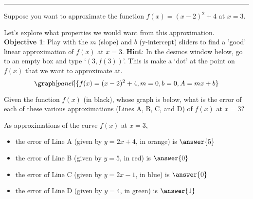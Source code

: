 \documentclass[handout,nooutcomes]{ximera}
\begin{document}
\hrule
\medskip

Suppose you want to approximate the function $f(x) = (x-2)^2  + 4$ at $x=3$.

Let's explore what properties we would want from this approximation.\\


{\bf Objective 1}: Play with the $m$ (slope) and $b$ (y-intercept) sliders to find
a 'good' linear approximation of $f(x)$ at $x=3$.
{\bf Hint}: In the desmos window below, go to an empty box and type `$(3,f(3))$'. 
This is make a `dot' at the point on $f(x)$ that we want to approximate at.
\[
\graph[panel]{f(x) = (x-2)^2 + 4, m=0, b=0, A=mx+b}
\]

\begin{question}
Given the function $f(x)$ (in black), whose graph is below, 
what is the error of each of these various approximations
(Lines A, B, C, and D) of $f(x)$ at $x=3$?


As approximations of the curve $f(x)$ at $x=3$,\\
\begin{itemize}
\item the error of Line A (given by $y=2x+4$, in orange) is $\answer{5}$\\
\item the error of Line B (given by $y=5$, in red) is $\answer{0}$\\
\item the error of Line C (given by $y=2x-1$, in blue) is $\answer{0}$\\
\item the error of Line D (given by $y=4$, in green) is $\answer{1}$\\
\end{itemize}


\end{question}
\end{document}
